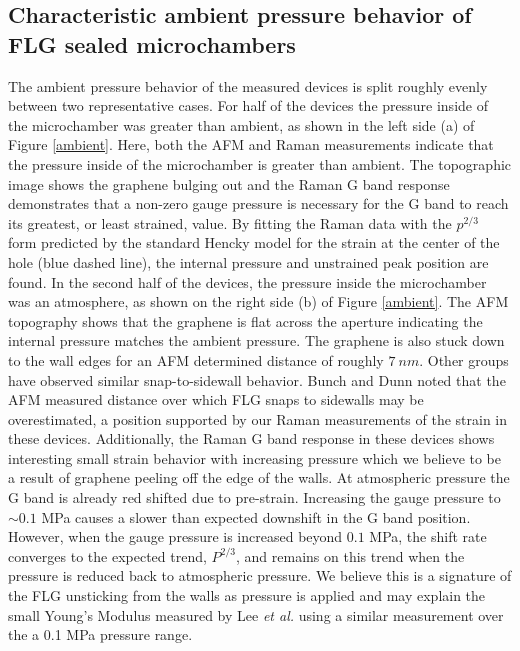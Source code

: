 \subsection{Characteristic ambient pressure behavior of FLG sealed microchambers}
The ambient pressure behavior of the measured devices is split roughly evenly between two representative cases. For half of the devices the pressure inside of the microchamber was greater than ambient, as shown in the left side (a) of Figure \ref{ambient}.  Here, both the AFM and Raman measurements indicate that the pressure inside of the microchamber is greater than ambient. The topographic image shows the graphene bulging out and the Raman G band response demonstrates that a non-zero gauge pressure is necessary for the G band to reach its greatest, or least strained, value. By fitting the Raman data with the $p^{2/3}$ form predicted by the standard Hencky model for the strain at the center of the hole (blue dashed line), the internal pressure and unstrained peak position are found. In the second half of the devices, the pressure inside the microchamber was an atmosphere, as shown on the right side (b) of Figure \ref{ambient}.  The AFM topography shows that the graphene is flat across the aperture indicating the internal pressure matches the ambient pressure. The graphene is also stuck down to the wall edges for an AFM determined distance of roughly $7 \ nm$.  Other groups have observed similar snap-to-sidewall behavior\cite{Lee2008,Bunch2008}. Bunch and Dunn noted that the AFM measured distance over which FLG snaps to sidewalls may be overestimated\cite{Bunch2012}, a position supported by our Raman measurements of the strain in these devices.  Additionally, the Raman G band response in these devices shows interesting small strain behavior with increasing pressure which we believe to be a result of graphene peeling off the edge of the walls. At atmospheric pressure the G band is already red shifted due to pre-strain. Increasing the gauge pressure to $\sim 0.1$ MPa causes a slower than expected downshift in the G band position. However, when the gauge pressure is increased beyond $0.1$ MPa, the shift rate converges to the expected trend, $P^{2/3}$, and remains on this trend when the pressure is reduced back to atmospheric pressure.  We believe this is a signature of the FLG unsticking from the walls as pressure is applied and may explain the small Young's Modulus measured by Lee \emph{et al.} using a similar measurement over the a 0.1 MPa pressure range\cite{Lee2012}.

